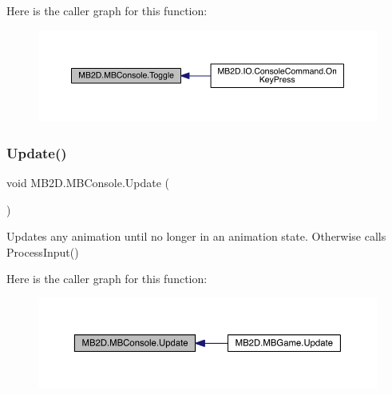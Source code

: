 Here is the caller graph for this function\+:
\nopagebreak
\begin{figure}[H]
\begin{center}
\leavevmode
\includegraphics[width=350pt]{class_m_b2_d_1_1_m_b_console_aab4c284a98afb148e35cf28e6d8ba0fc_icgraph}
\end{center}
\end{figure}
\hypertarget{class_m_b2_d_1_1_m_b_console_a4239aee536dc49bbbd59d81d79f24266}{}\label{class_m_b2_d_1_1_m_b_console_a4239aee536dc49bbbd59d81d79f24266} 
\subsubsection{\texorpdfstring{Update()}{Update()}}
{\footnotesize\ttfamily void M\+B2\+D.\+M\+B\+Console.\+Update (\begin{DoxyParamCaption}{ }\end{DoxyParamCaption})\hspace{0.3cm}{\ttfamily [inline]}}



Updates any animation until no longer in an animation state. Otherwise calls Process\+Input() 

Here is the caller graph for this function\+:
\nopagebreak
\begin{figure}[H]
\begin{center}
\leavevmode
\includegraphics[width=350pt]{class_m_b2_d_1_1_m_b_console_a4239aee536dc49bbbd59d81d79f24266_icgraph}
\end{center}
\end{figure}
\hypertarget{class_m_b2_d_1_1_m_b_console_a1d85081cb5400f09883c1fc62f37d861}{}\label{class_m_b2_d_1_1_m_b_console_a1d85081cb5400f09883c1fc62f37d861} 
